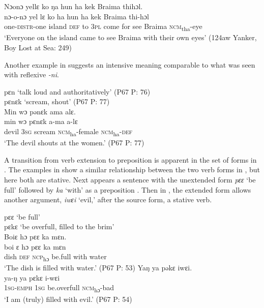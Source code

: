 \vspace{6pt}
\ex Nɔonɔ yellɛ ko ŋa hun ha kek Braima thihɔl.\\
  \gll nɔ-o-nɔ      yel    lɛ    ko    ha    hun    ha    kek  Braima  thi-hɔl\\
  one-\textsc{distr}{}-one  island    \textsc{def}  to    3\textsc{pl}  come    for    see  Braima  \textsc{ncm}\textsubscript{tha}{}-eye\\
  \glt ‘Everyone on the island came to see Braima with their own eyes' (124aw Yanker, Boy Lost at Sea: 249)
\z
\z

Another example in  suggests an intensive meaning comparable to what was seen with reflexive \textit{{}-ni}.

\ea%
    \label{ex:167}
   \ea \label{ex:167a} pɛn \tab ‘talk loud and authoritatively' (P67 P: 76)\\
    pɛnɛk \tab ‘scream, shout' (P67 P: 77)\\
\vspace{6pt}
  \ex \label{ex:167b} Min wɔ pənɛk ama alɛ.\\
  \gll min  wɔ    pɛnɛk    a-ma      a-lɛ\\
  devil  \textsc{3sg}  scream  \textsc{ncm}\textsubscript{ha}{}-female  \textsc{ncm}\textsubscript{ha}{}-\textsc{def}\\
  \glt ‘The devil shouts at the women.' (P67 P: 77)
\z
\z

A transition from verb extension to preposition is apparent in the set of forms in . The examples in  show a similar relationship between the two verb forms in , but here both are stative. Next appears a sentence with the unextended form \textit{pɛɛ} ‘be full' followed by \textit{ka} ‘with' as a preposition . Then in , the extended form allows another argument, \textit{iwɛi} ‘evil,'  after the source form, a stative verb.

\ea%
  \label{ex:168}
\ea  \label{ex:168a} pɛɛ \tab ‘be full'\\
  pɛkɛ \tab ‘be overfull, filled to the brim'\\
  \vspace{6pt}
  \ex \label{ex:168b}  Boiɛ hɔ pɛɛ ka mɛn.\\
  \gll boi   ɛ     hɔ       pɛɛ  ka    mɛn\\
  dish  \textsc{def}  \textsc{ncp}\textsubscript{hɔ}    be.full  with  water\\
  \glt ‘The dish is filled with water.' (P67 P: 53)
\vspace{6pt}
\ex \label{ex:168c} Yaŋ ya pəkɛ iwɛi.\\
  \gll ya-ŋ      ya    pɛkɛ      i-wɛi\\
  \textsc{1sg-emph}  \textsc{1sg}  be.overfull    \textsc{ncm}\textsubscript{hɔ}{}-bad\\
  \glt ‘I am (truly) filled with evil.' (P67 P: 54)
\z
\z

